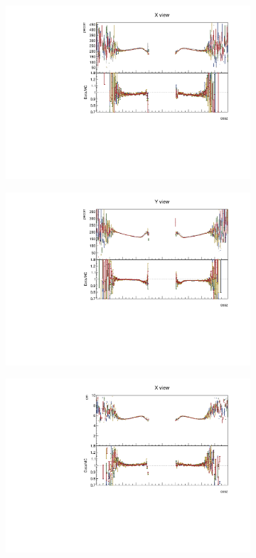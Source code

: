 \documentclass[12pt,a4paper]{article}
\begin{document}
\begin{figure}[!ht]
\begin{subfigure}{0.5\textwidth}
  \end{subfigure}
  \begin{subfigure}{0.5\textwidth}
    \includegraphics[width=\linewidth]{PlotsAngularDistribution/pecorr_cosz_x.pdf}
  \end{subfigure}
  \begin{subfigure}{0.5\textwidth}
    \includegraphics[width=\linewidth]{PlotsAngularDistribution/pecorr_cosz_y.pdf}
  \end{subfigure}
  \begin{subfigure}{0.5\textwidth}
    \includegraphics[width=\linewidth]{PlotsAngularDistribution/cm_cosz_x.pdf}

\end{subfigure}
\end{figure}
\end{document}
